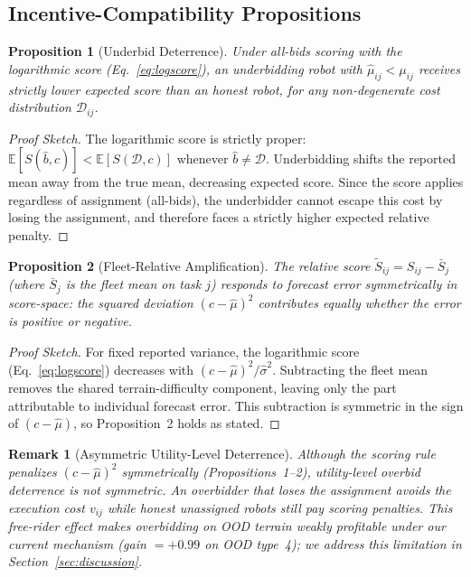 \documentclass[letterpaper, 10pt, conference]{ieeeconf}
\newtheorem{proposition}{Proposition}
\newtheorem{remark}{Remark}
\begin{document}
\subsection{Incentive-Compatibility Propositions}

\begin{proposition}[Underbid Deterrence]
\label{prop:underbid}
Under all-bids scoring with the logarithmic score (Eq.~\ref{eq:logscore}), an
underbidding robot with $\hat{\mu}_{ij} < \mu_{ij}$ receives strictly lower
expected score than an honest robot, for any non-degenerate cost
distribution $\mathcal{D}_{ij}$.
\end{proposition}
\begin{proof}[Proof Sketch]
The logarithmic score is strictly proper: $\mathbb{E}[S(\hat{b}, c)] <
\mathbb{E}[S(\mathcal{D}, c)]$ whenever $\hat{b} \neq \mathcal{D}$.
Underbidding shifts the reported mean away from the true mean, decreasing
expected score. Since the score applies regardless of assignment (all-bids),
the underbidder cannot escape this cost by losing the assignment, and therefore
faces a strictly higher expected relative penalty.
\end{proof}

\begin{proposition}[Fleet-Relative Amplification]
\label{prop:relative}
The relative score $\tilde{S}_{ij} = S_{ij} - \bar{S}_j$ (where
$\bar{S}_j$ is the fleet mean on task $j$) responds to forecast error
symmetrically in score-space: the squared deviation $(c - \hat{\mu})^2$
contributes equally whether the error is positive or negative.
\end{proposition}
\begin{proof}[Proof Sketch]
For fixed reported variance, the logarithmic score (Eq.~\ref{eq:logscore})
decreases with $(c - \hat{\mu})^2 / \hat{\sigma}^2$. Subtracting the fleet mean
removes the shared terrain-difficulty component, leaving only the part
attributable to individual forecast error. This subtraction is symmetric in the
sign of $(c - \hat{\mu})$, so Proposition~2 holds as stated.
\end{proof}

\begin{remark}[Asymmetric Utility-Level Deterrence]
Although the scoring rule penalizes $(c - \hat{\mu})^2$ symmetrically
(Propositions~1--2), utility-level overbid deterrence is \emph{not} symmetric.
An overbidder that loses the assignment avoids the execution cost $v_{ij}$
while honest unassigned robots still pay scoring penalties.  This free-rider
effect makes overbidding on OOD terrain weakly profitable under our current
mechanism (gain $= +0.99$ on OOD type~4); we address this limitation in
Section~\ref{sec:discussion}.
\end{remark}
\end{document}

